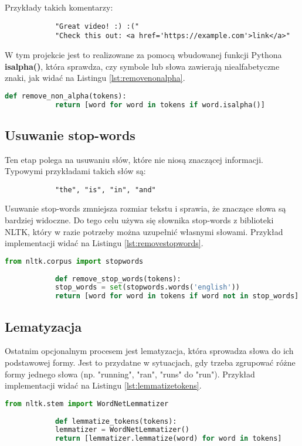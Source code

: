 		Przykłady takich komentarzy:

		\begin{verbatim}
			"Great video! :) :("
			"Check this out: <a href='https://example.com'>link</a>"
		\end{verbatim}
		W tym projekcie jest to realizowane za pomocą wbudowanej funkcji Pythona \textbf{isalpha()}, która sprawdza, czy symbole lub słowa zawierają niealfabetyczne znaki, jak widać na Listingu \ref{lst:removenonalpha}.
		
		\begin{lstlisting}[language=Python, caption={Funkcja usuwająca niealfabetyczne symbole}, label={lst:removenonalpha}]
			def remove_non_alpha(tokens):
			return [word for word in tokens if word.isalpha()]
		\end{lstlisting}
		
	\subsection{Usuwanie stop-words}
		Ten etap polega na usuwaniu słów, które nie niosą znaczącej informacji. Typowymi przykładami takich słów są:
		\begin{verbatim}
			"the", "is", "in", "and"
		\end{verbatim}
		Usuwanie stop-words zmniejsza rozmiar tekstu i sprawia, że znaczące słowa są bardziej widoczne. Do tego celu używa się słownika stop-words z biblioteki NLTK, który w razie potrzeby można uzupełnić własnymi słowami. Przykład implementacji widać na Listingu \ref{lst:removestopwords}.
		\begin{lstlisting}[language=Python, caption={Funkcja usuwająca stop słowa}, label={lst:removestopwords}]
			from nltk.corpus import stopwords
			
			def remove_stop_words(tokens):
			stop_words = set(stopwords.words('english'))
			return [word for word in tokens if word not in stop_words]
		\end{lstlisting}

	\subsection{Lematyzacja}
		Ostatnim opcjonalnym procesem jest lematyzacja, która sprowadza słowa do ich podstawowej formy. Jest to przydatne w sytuacjach, gdy trzeba zgrupować różne formy jednego słowa (np. "running", "ran", "runs" do "run"). Przykład implementacji widać na Listingu \ref{lst:lemmatizetokens}.

		\begin{lstlisting}[language=Python, caption={Funkcja lematyzująca tokeny}, label={lst:lemmatizetokens}]
			from nltk.stem import WordNetLemmatizer
			
			def lemmatize_tokens(tokens):
			lemmatizer = WordNetLemmatizer()
			return [lemmatizer.lemmatize(word) for word in tokens]
		\end{lstlisting}


